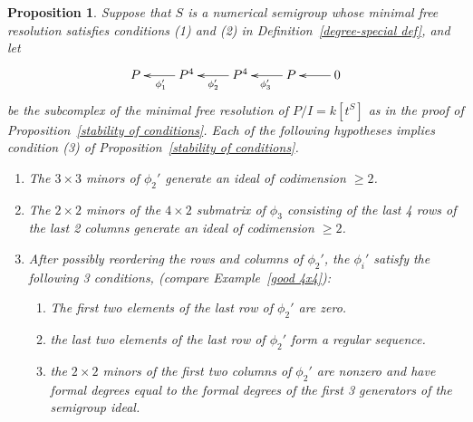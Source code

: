 \documentclass[twoside,12pt, leqno]{amsart}
\newtheorem{proposition}[theorem]{Proposition}
\theoremstyle{definition}
\begin{document}
\begin{proposition}\label{degree-special consequences}
Suppose that $S$ is a numerical semigroup whose minimal free resolution satisfies
conditions (1) and (2) in Definition~\ref{degree-special def}, and let
$$
\xymatrix{P &\ar[l]^{\phi_{1}'} P^{4} &\ar[l]^{\phi_{2}'} P^{4} &\ar[l]^{\phi_{3}'} P &\ar[l] 0}
$$
 be the subcomplex of the minimal free resolution of $P/I = k[t^S]$
 as in the proof of Proposition~\ref{stability of conditions}. Each of the following 
 hypotheses implies condition (3) of Proposition~\ref{stability of conditions}.
 
\begin{enumerate}
\item \label{BE hypothesis} The $3\times 3$ minors of $\phi_{2}'$ generate an ideal of codimension $\geq 2$.

 \item\label{2} The $2\times 2$ minors of the $4\times 2$ submatrix of $\phi_{3}$ consisting of the 
 last 4 rows of the last 2 columns generate an ideal of codimension $\geq 2$.
 
 \item \label {3} After possibly reordering the rows and columns of $\phi_{2}'$, the $\phi_{i}'$ satisfy the following 3 conditions, 
(compare Example~\ref{good 4x4}):

\begin{enumerate}

 \item 
 The first two elements of the last row of $\phi_{2}'$ are zero. 
 
 \item the last two elements of the last row of $\phi_{2}'$ form a regular sequence.

 \item  the $2\times 2$ minors of the first two columns of $\phi_{2}'$
 are nonzero and have formal degrees equal to the formal degrees of
 the first 3 generators of the semigroup ideal.
  
\end{enumerate}
  
\end{enumerate}
\end{proposition}
\end{document}
